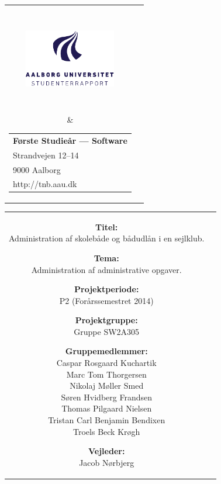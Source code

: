 \thispagestyle{empty}
\enlargethispage*{\ifcounts 4\else 2\fi\baselineskip}
{\samepage
\begin{tabular}{cc}
  \parbox{0.5\textwidth}{ %
    \hspace*{1cm} %
    \includegraphics[width=4cm,height=4cm,keepaspectratio]{images/aau_logo_da.pdf}} &
  \parbox{0.5\textwidth}{\begin{tabular}{l}
      {\small \textbf{Første Studieår --- Software}}\\
      {\small Strandvejen 12--14} \\
      {\small 9000 Aalborg} \\
      {\small http://tnb.aau.dk}
    \end{tabular}}
\end{tabular}

\begin{tabular}{cc}
  \parbox{8cm}{
  \begin{description}
    \item { \textbf{Titel:}}\\ 
      Administration af skolebåde og bådudlån i en sejlklub.
    \item { \textbf{Tema:}}\\ 
      Administration af administrative opgaver.
  \end{description}
  
  \parbox{8cm}{
  \begin{description}
    \item { \textbf{Projektperiode:}}\\
      P2 (Forårssemestret 2014)
    \hspace{4cm}
    \item { \textbf{Projektgruppe:}}\\
        Gruppe SW2A305
    \hspace{4cm}
    \item {\textbf{Gruppemedlemmer:}}\\
      Caspar Rosgaard Kuchartik\\
      Marc Tom Thorgersen\\
      Nikolaj Møller Smed\\
      Søren Hvidberg Frandsen\\
      Thomas Pilgaard Nielsen\\
      Tristan Carl Benjamin Bendixen\\
      Troels Beck Krøgh\\
    \hspace{2cm}
    \item { \textbf{Vejleder:}}\\
      Jacob Nørbjerg\\
    \end{description}
  }

}
\end{tabular}}
